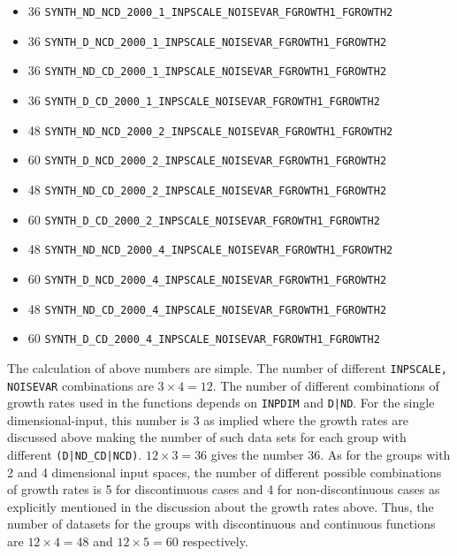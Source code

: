 \begin{itemize}
\item 36 \texttt{SYNTH\_ND\_NCD\_2000\_1\_INPSCALE\_NOISEVAR\_FGROWTH1\_FGROWTH2}
\item 36 \texttt{SYNTH\_D\_NCD\_2000\_1\_INPSCALE\_NOISEVAR\_FGROWTH1\_FGROWTH2}
\item 36 \texttt{SYNTH\_ND\_CD\_2000\_1\_INPSCALE\_NOISEVAR\_FGROWTH1\_FGROWTH2}
\item 36 \texttt{SYNTH\_D\_CD\_2000\_1\_INPSCALE\_NOISEVAR\_FGROWTH1\_FGROWTH2}

\item 48 \texttt{SYNTH\_ND\_NCD\_2000\_2\_INPSCALE\_NOISEVAR\_FGROWTH1\_FGROWTH2}
\item 60 \texttt{SYNTH\_D\_NCD\_2000\_2\_INPSCALE\_NOISEVAR\_FGROWTH1\_FGROWTH2}
\item 48 \texttt{SYNTH\_ND\_CD\_2000\_2\_INPSCALE\_NOISEVAR\_FGROWTH1\_FGROWTH2}
\item 60 \texttt{SYNTH\_D\_CD\_2000\_2\_INPSCALE\_NOISEVAR\_FGROWTH1\_FGROWTH2}

\item 48 \texttt{SYNTH\_ND\_NCD\_2000\_4\_INPSCALE\_NOISEVAR\_FGROWTH1\_FGROWTH2}
\item 60 \texttt{SYNTH\_D\_NCD\_2000\_4\_INPSCALE\_NOISEVAR\_FGROWTH1\_FGROWTH2}
\item 48 \texttt{SYNTH\_ND\_CD\_2000\_4\_INPSCALE\_NOISEVAR\_FGROWTH1\_FGROWTH2}
\item 60 \texttt{SYNTH\_D\_CD\_2000\_4\_INPSCALE\_NOISEVAR\_FGROWTH1\_FGROWTH2}
\end{itemize}

The calculation of above numbers are simple. The number of different \texttt{INPSCALE, NOISEVAR} combinations are $3\times 4=12$. The number of different combinations of growth rates used in the functions depends on \texttt{INPDIM} and \texttt{D|ND}. For the single dimensional-input, this number is 3 as implied where the growth rates are discussed above making the number of such data sets for each group with different \texttt{(D|ND\_CD|NCD)}. $12\times 3=36$ gives the number 36. As for the groups with 2 and 4 dimensional input spaces, the number of different possible combinations of growth rates is 5 for discontinuous cases and 4 for non-discontinuous cases as explicitly mentioned in the discussion about the growth rates above. Thus, the number of datasets for the groups with discontinuous and continuous functions are $12\times 4=48$ and $12\times 5=60$ respectively.

